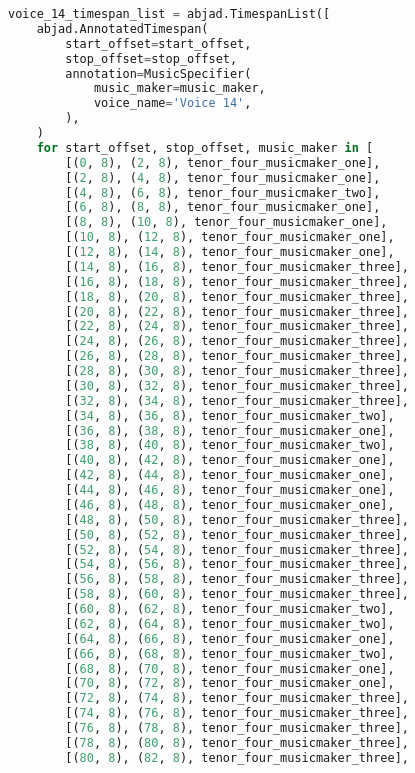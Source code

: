 \begin{lstlisting}[language=Python, caption=Invocation Source Code]
voice_14_timespan_list = abjad.TimespanList([
    abjad.AnnotatedTimespan(
        start_offset=start_offset,
        stop_offset=stop_offset,
        annotation=MusicSpecifier(
            music_maker=music_maker,
            voice_name='Voice 14',
        ),
    )
    for start_offset, stop_offset, music_maker in [
        [(0, 8), (2, 8), tenor_four_musicmaker_one],
        [(2, 8), (4, 8), tenor_four_musicmaker_one],
        [(4, 8), (6, 8), tenor_four_musicmaker_two],
        [(6, 8), (8, 8), tenor_four_musicmaker_one],
        [(8, 8), (10, 8), tenor_four_musicmaker_one],
        [(10, 8), (12, 8), tenor_four_musicmaker_one],
        [(12, 8), (14, 8), tenor_four_musicmaker_one],
        [(14, 8), (16, 8), tenor_four_musicmaker_three],
        [(16, 8), (18, 8), tenor_four_musicmaker_three],
        [(18, 8), (20, 8), tenor_four_musicmaker_three],
        [(20, 8), (22, 8), tenor_four_musicmaker_three],
        [(22, 8), (24, 8), tenor_four_musicmaker_three],
        [(24, 8), (26, 8), tenor_four_musicmaker_three],
        [(26, 8), (28, 8), tenor_four_musicmaker_three],
        [(28, 8), (30, 8), tenor_four_musicmaker_three],
        [(30, 8), (32, 8), tenor_four_musicmaker_three],
        [(32, 8), (34, 8), tenor_four_musicmaker_three],
        [(34, 8), (36, 8), tenor_four_musicmaker_two],
        [(36, 8), (38, 8), tenor_four_musicmaker_one],
        [(38, 8), (40, 8), tenor_four_musicmaker_two],
        [(40, 8), (42, 8), tenor_four_musicmaker_one],
        [(42, 8), (44, 8), tenor_four_musicmaker_one],
        [(44, 8), (46, 8), tenor_four_musicmaker_one],
        [(46, 8), (48, 8), tenor_four_musicmaker_one],
        [(48, 8), (50, 8), tenor_four_musicmaker_three],
        [(50, 8), (52, 8), tenor_four_musicmaker_three],
        [(52, 8), (54, 8), tenor_four_musicmaker_three],
        [(54, 8), (56, 8), tenor_four_musicmaker_three],
        [(56, 8), (58, 8), tenor_four_musicmaker_three],
        [(58, 8), (60, 8), tenor_four_musicmaker_three],
        [(60, 8), (62, 8), tenor_four_musicmaker_two],
        [(62, 8), (64, 8), tenor_four_musicmaker_two],
        [(64, 8), (66, 8), tenor_four_musicmaker_one],
        [(66, 8), (68, 8), tenor_four_musicmaker_two],
        [(68, 8), (70, 8), tenor_four_musicmaker_one],
        [(70, 8), (72, 8), tenor_four_musicmaker_one],
        [(72, 8), (74, 8), tenor_four_musicmaker_three],
        [(74, 8), (76, 8), tenor_four_musicmaker_three],
        [(76, 8), (78, 8), tenor_four_musicmaker_three],
        [(78, 8), (80, 8), tenor_four_musicmaker_three],
        [(80, 8), (82, 8), tenor_four_musicmaker_three],

\end{lstlisting}
